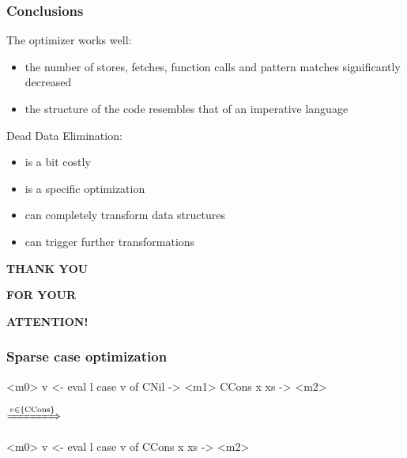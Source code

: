 \documentclass[bigger]{beamer}
\begin{document}
\begin{frame}[fragile]
\frametitle{Conclusions}
	\begin{vfitemize}
		\item The optimizer works well:
			\begin{itemize}
				\item the number of stores, fetches, function calls and pattern matches significantly decreased
				\item the structure of the code resembles that of an imperative language
			\end{itemize}
		\item Dead Data Elimination:
			\begin{itemize}
				\item is a bit costly 
				\item is a specific optimization
				\item can completely transform data structures
				\item can trigger further transformations
			\end{itemize}
	\end{vfitemize}
\end{frame}


{
	\begin{frame}{}
	
	\bigskip\bigskip\bigskip
	
	{\bf\Huge\color{white} THANK YOU}
	
	\bigskip
	
	{\bf\Huge\color{white} FOR YOUR}
	
	\bigskip
	
	{\bf\Huge\color{white} ATTENTION!}
	
\end{frame}
}


\begin{frame}[fragile]
\frametitle{Sparse case optimization}

\begin{center}
	\begin{minipage}{0.40\textwidth}
		\begin{haskellcode}
			<m0>
			v <- eval l
			case v of
			CNil       -> <m1>
			CCons x xs -> <m2>
		\end{haskellcode}
	\end{minipage}
	$\xRightarrow{v \in \{ \text{CCons}\}}$
	\hfill
	\begin{minipage}{0.40\textwidth}
		\begin{haskellcode}
			<m0>
			v <- eval l
			case v of
			CCons x xs -> <m2>
		\end{haskellcode}
	\end{minipage}
\end{center}

\end{frame}
\end{document}
